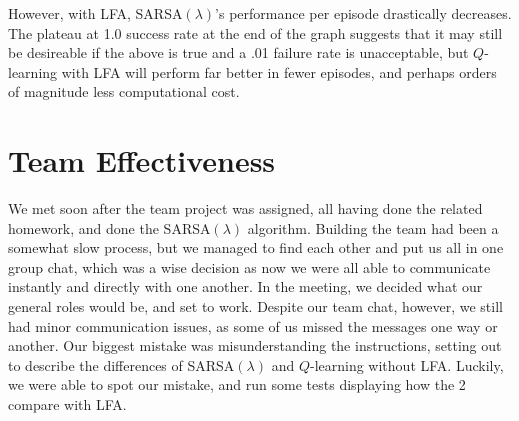 \documentclass[10pt,conference]{IEEEtran}
\begin{document}
However, with LFA, SARSA\((\lambda)\)'s performance per episode drastically 
decreases. The plateau at 1.0 success rate at the end of the graph suggests that 
it may still be desireable if the above is true and a .01 failure rate is unacceptable, 
but \(Q\)-learning with LFA will perform far better in fewer episodes, and perhaps orders of magnitude less computational cost.


\section{Team Effectiveness}
We met soon after the team project was assigned, all having done the related homework, and done the SARSA\((\lambda)\) algorithm. Building the team had been a somewhat slow process, but we managed to find each other and put us all in one group chat, which was a wise decision as now we were all able to communicate instantly and directly with one another. In the meeting, we decided what our general roles would be, and set to work. Despite our team chat, however, we still had minor communication issues, as some of us missed the messages one way or another. Our biggest mistake was misunderstanding the instructions, setting out to describe the differences of SARSA\((\lambda)\) and \(Q\)-learning without LFA. Luckily, we were able to spot our mistake, and run some tests displaying how the 2 compare with LFA.
\label{sec:team}




\end{document}
